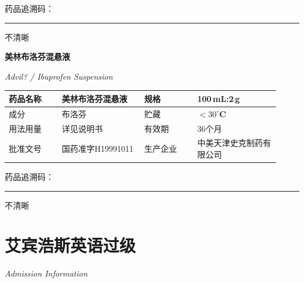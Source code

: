 \documentclass[UTF8,10pt,a4paper,fontset=fandol]{ctexart}
\newcommand{\fieldvalue}[1]{#1}
\newcommand{\handwritten}[1]{#1}
\begin{document}
\begin{center}
\begin{minipage}{0.92\linewidth}
\smallskip
药品追溯码：\rule{0.65\linewidth}{0.4pt}

\fieldvalue{\handwritten{不清晰}}
\end{minipage}

\vspace{1em}

\begin{minipage}{0.92\linewidth}
\centering
\textbf{\Large 美林布洛芬混悬液}

\smallskip
\textit{Advil? / Ibuprofen Suspension}

\begin{tabular}{|p{0.18\linewidth}|p{0.28\linewidth}|p{0.18\linewidth}|p{0.28\linewidth}|}
\hline
药品名称 & 美林布洛芬混悬液 & 规格 & 100\,mL:2\,g \\
\hline
成分 & 布洛芬 & 贮藏 & \textbf{$<30^\circ$C} \\
\hline
用法用量 & 详见说明书 & 有效期 & 36个月 \\
\hline
批准文号 & 国药准字H19991011 & 生产企业 & 中美天津史克制药有限公司 \\
\hline
\end{tabular}

\smallskip
药品追溯码：\rule{0.65\linewidth}{0.4pt}

\fieldvalue{\handwritten{不清晰}}
\end{minipage}
\end{center}


\newpage

\section*{艾宾浩斯英语过级}

\textit{Admission Information}
\end{document}
